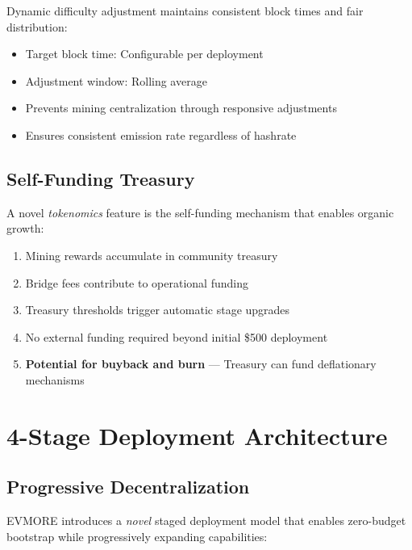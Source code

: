 \documentclass[11pt,a4paper]{article}
\begin{document}
Dynamic difficulty adjustment maintains consistent block times and fair distribution:

\begin{itemize}
    \item Target block time: Configurable per deployment
    \item Adjustment window: Rolling average
    \item Prevents mining centralization through responsive adjustments
    \item Ensures consistent emission rate regardless of hashrate
\end{itemize}

\subsection{Self-Funding Treasury}

A novel \textit{tokenomics} feature is the self-funding mechanism that enables organic growth:

\begin{enumerate}
    \item Mining rewards accumulate in community treasury
    \item Bridge fees contribute to operational funding
    \item Treasury thresholds trigger automatic stage upgrades
    \item No external funding required beyond initial \$500 deployment
    \item \textbf{Potential for buyback and burn} --- Treasury can fund deflationary mechanisms
\end{enumerate}

\section{4-Stage Deployment Architecture}

\subsection{Progressive Decentralization}

EVMORE introduces a \textit{novel} staged deployment model that enables zero-budget bootstrap while progressively expanding capabilities:
\end{document}
